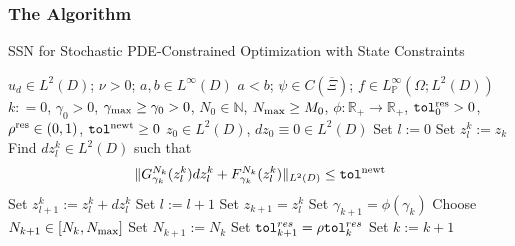 \documentclass[aspectratio=169,xcolor=dvipsnames,11pt]{beamer}
\begin{document}
\begin{footnotesize}
\begin{frame}\frametitle{The Algorithm}\tiny
\begin{algorithm}[H]
 \caption{SSN for Stochastic PDE-Constrained Optimization with State Constraints}
 \label{alg:SA}
 {\LinesNotNumbered 
 \begin{algorithmic}
 $u_d \in L^2(D)$; $\nu > 0$; $a,b \in L^{\infty}(D)$ $a < b$; $\psi \in C(\overline{\Xi})$;  $f \in L^{\infty}_{\mathbb P}(\Omega; L^2(D))$
 $k : = 0$, 
$\gamma_0 > 0$,
$\gamma_{\rm max} \ge \gamma_0 > 0$,
$N_{0} \in \mathbb N$,  
$N_{\rm max} \ge M_{0}$, 
$\phi : \mathbb R_+ \to \mathbb R_+$,  
${\tt tol}^{\rm res}_0 > 0$, 
$\rho^{\rm res} \in (0,1)$, 
${\tt tol}^{\rm newt} \ge 0$
  $z_0 \in L^2(D)$, $dz_{0} \equiv 0 \in L^2(D)$
\STATE Set $l := 0$
\STATE Set $z^{k}_{l} := z_k$
\STATE Find $dz^{k}_{l} \in L^2(D)$ such that 
\begin{equation*}%
\| G_{\gamma_k}^{N_k}(z^{k}_{l}) dz^{k}_{l} + F_{\gamma_k}^{N_k}(z^{k}_{l}) \|_{L^2(D)} \le {\tt tol^{\rm newt}}
\end{equation*}
\STATE  Set $z^{k}_{l + 1} := z^{k}_{l} + dz^{k}_{l}$
\STATE  Set $l := l + 1$
\ENDWHILE
\STATE Set $z_{k+1} = z^{k}_{l}$
\STATE Set $\gamma_{k+1} = \phi(\gamma_k)$
\STATE Choose $N_{k+1} \in [N_{k},N_{\rm max}]$
\ELSE{}
\STATE Set $N_{k+1} := N_k$
\ENDIF
\STATE Set ${\tt tol}^{res}_{k+1} = \rho {\tt tol}^{res}_{k}$
\STATE Set $k := k + 1$
\ENDWHILE
\end{algorithmic}
}
\end{algorithm}
\end{frame}


\end{footnotesize}
\end{document}
